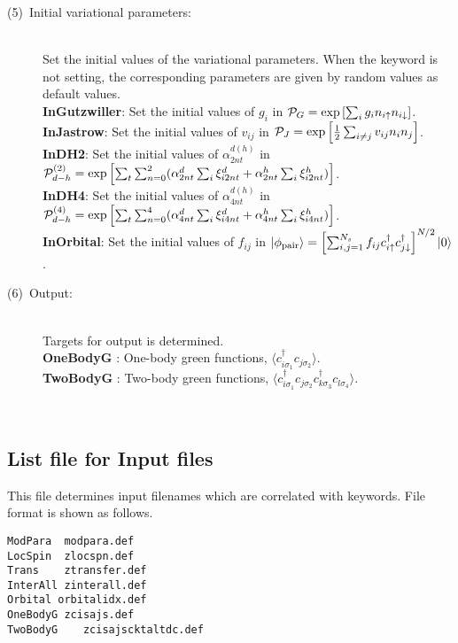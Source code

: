 \begin{description}
\item[(5)~Initial variational parameters:]
~\\ Set the initial values of the variational parameters. When the keyword is not setting, the corresponding parameters are given by random values as default values.
~\\{\bf InGutzwiller}: Set the initial values of $g_i$ in ${\cal P}_G=\exp\left[ \sum_i g_i n_{i\uparrow} n_{i\downarrow} \right]$.
~\\{\bf InJastrow}: Set the initial values of $v_{ij}$ in ${\cal P}_J=\exp\left[\frac{1}{2} \sum_{i\neq j} v_{ij} n_i n_j\right]$.
~\\{\bf InDH2}:  Set the initial values of $\alpha_{2nt}^{d(h)}$ in ${\cal P}_{d-h}^{(2)}= \exp \left[ \sum_t \sum_{n=0}^2 (\alpha_{2nt}^d \sum_{i}\xi_{i2nt}^d+\alpha_{2nt}^h \sum_{i}\xi_{i2nt}^h)\right]$.
~\\{\bf InDH4}:  Set the initial values of $\alpha_{4nt}^{d(h)}$ in ${\cal P}_{d-h}^{(4)}= \exp \left[ \sum_t \sum_{n=0}^4 (\alpha_{4nt}^d \sum_{i}\xi_{i4nt}^d+\alpha_{4nt}^h \sum_{i}\xi_{i4nt}^h)\right]$.
~\\{\bf InOrbital}: Set the initial values of $ f_{ij}$ in $|\phi_{\rm pair} \rangle = \left[\sum_{i, j=1}^{N_s} f_{ij}c_{i\uparrow}^{\dag}c_{j\downarrow}^{\dag} \right]^{N/2}|0 \rangle$.

\item[(6)~Output:]
~\\
Targets for output is determined.
~\\{\bf OneBodyG }: One-body green functions,  $\langle c^{\dagger}_{i\sigma_1}c_{j\sigma_2}\rangle$.
~\\{\bf TwoBodyG }: Two-body green functions,  $\langle c^{\dagger}_{i\sigma_1}c_{j\sigma_2}c^{\dagger}_{k \sigma_3}c_{l\sigma_4}\rangle$.
\end{description}
\newpage
~\subsection{List file for Input files}
\label{Subsec:InputFileList}
This file determines input filenames which are correlated with keywords. File format is shown as follows.\\
\begin{minipage}{10cm}
\begin{screen}
\begin{verbatim}
ModPara  modpara.def
LocSpin  zlocspn.def
Trans    ztransfer.def
InterAll zinterall.def
Orbital orbitalidx.def
OneBodyG zcisajs.def
TwoBodyG	zcisajscktaltdc.def
\end{verbatim}
\end{screen}
\end{minipage}
\\
